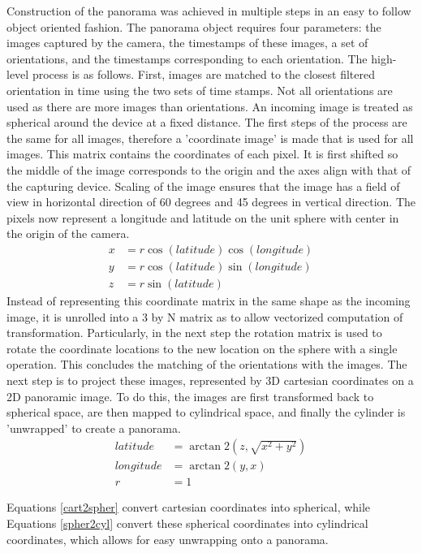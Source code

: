 \documentclass[letterpaper, 10 pt, conference]{ieeeconf}  %
\begin{document}
Construction of the panorama was achieved in multiple steps in an easy to follow object oriented fashion. The panorama object requires four parameters: the images captured by the camera, the timestamps of these images, a set of orientations, and the timestamps corresponding to each orientation. The high-level process is as follows. First, images are matched to the closest filtered orientation in time using the two sets of time stamps. Not all orientations are used as there are more images than orientations. An incoming image is treated as spherical around the device at a fixed distance. The first steps of the process are the same for all images, therefore a 'coordinate image' is made that is used for all images. This matrix contains the coordinates of each pixel. It is first shifted so the middle of the image corresponds to the origin and the axes align with that of the capturing device. Scaling of the image ensures that the image has a field of view in horizontal direction of 60 degrees and 45 degrees in vertical direction. The pixels now represent a longitude and latitude on the unit sphere with center in the origin of the camera.
\begin{align*}
x &= r \cos(latitude) \cos(longitude) \\
y &= r \cos(latitude) \sin(longitude) \\
z &= r \sin(latitude)
\end{align*}
Instead of representing this coordinate matrix in the same shape as the incoming image, it is unrolled into a 3 by N matrix as to allow vectorized computation of transformation. Particularly, in the next step the rotation matrix is used to rotate the coordinate locations to the new location on the sphere with a single operation. This concludes the matching of the orientations with the images.
The next step is to project these images, represented by 3D cartesian coordinates on a 2D panoramic image. To do this, the images are first transformed back to spherical space, are then mapped to cylindrical space, and finally the cylinder is 'unwrapped' to create a panorama.
\begin{equation}
\begin{aligned}
latitude &= \arctan2\left(z, \sqrt{x^2 + y^2}\right) \\
longitude &= \arctan2\left(y, x\right) \\
r &= 1
\label{cart2spher}
\end{aligned}
\end{equation}

Equations \ref{cart2spher} convert cartesian coordinates into spherical, while Equations \ref{spher2cyl} convert these spherical coordinates into cylindrical coordinates, which allows for easy unwrapping onto a panorama.
\end{document}
